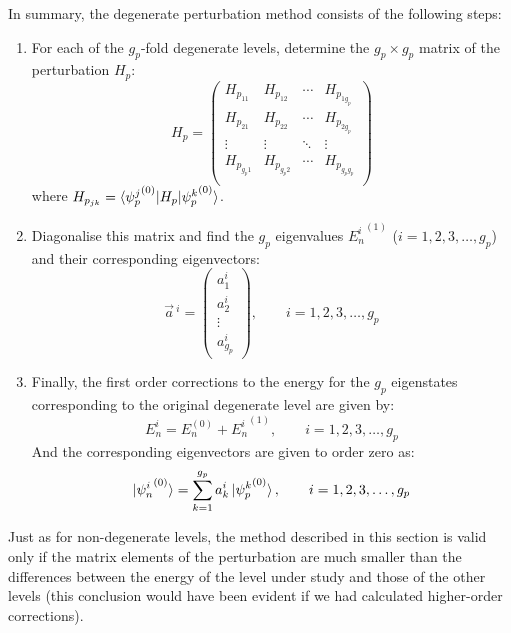 In summary, the degenerate perturbation method consists of the following steps:
\begin{enumerate}
    \item For each of the $g_p$-fold degenerate levels, determine the $g_p\times g_p$ matrix of the perturbation $H_p$:
    \begin{equation}
        H_p = \begin{pmatrix}
        H_{p_{11}} & H_{p_{12}} & \cdots & H_{p_{1g_p}} \\
        H_{p_{21}} & H_{p_{22}} & \cdots & H_{p_{2g_p}} \\
        \vdots & \vdots & \ddots & \vdots \\
        H_{p_{g_p1}} & H_{p_{g_p2}} & \cdots & H_{p_{g_pg_p}} \\
        \end{pmatrix}
    \end{equation}
    where $H_{p_{jk}} = \braket{{\psi_p^j}^{(0)}|H_p|{\psi_p^k}^{(0)}}$.
    \item Diagonalise this matrix and find the $g_p$ eigenvalues ${E_n^i}^{(1)}$ ($i = 1, 2, 3, \dots, g_p$) and their corresponding eigenvectors:
    \begin{equation}
        \vec{a}\,^i = \begin{pmatrix}
            a_1^i \\ a_2^i \\ \vdots \\ a_{g_p}^i 
        \end{pmatrix},\qquad i = 1, 2, 3, \dots, g_p
    \end{equation} 
    \item Finally, the first order corrections to the energy for the $g_p$ eigenstates corresponding to the original degenerate level are given by:
    \begin{equation}
        E_n^i = E_n^{(0)} + {E_n^i}^{(1)},\qquad i = 1, 2, 3, \dots, g_p
    \end{equation}
    And the corresponding eigenvectors are given to order zero as:
    \begin{equation}
        \ket{{\psi_n^i}^{(0)}} = \sum_{k=1}^{g_p} a_k^i\ket{{\psi_p^k}^{(0)}}, \qquad i = 1, 2, 3, \dots, g_p
    \end{equation}
\end{enumerate}

Just as for non-degenerate levels, the method described in this section is valid only if the matrix elements of the perturbation are much smaller than the differences between the energy of the level under study and those of the other levels (this conclusion would have been evident if we had calculated higher-order corrections).

